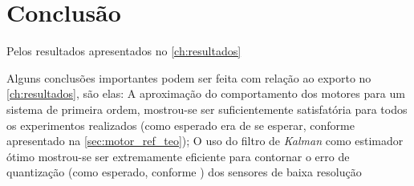 \chapter[Conclusão]{Conclusão}
\label{ch:conclusao}


Pelos resultados apresentados no \autoref{ch:resultados}

Alguns conclusões importantes podem ser feita com relação ao exporto no \autoref{ch:resultados}, são elas: A aproximação do comportamento dos motores para um sistema de primeira ordem, mostrou-se ser suficientemente satisfatória para todos os experimentos realizados (como esperado era de se esperar, conforme apresentado na \autoref{sec:motor_ref_teo}); O uso do filtro de \emph{Kalman} como estimador ótimo mostrou-se ser extremamente eficiente para contornar o erro de quantização (como esperado, conforme \cite{enco}) dos sensores de baixa resolução
